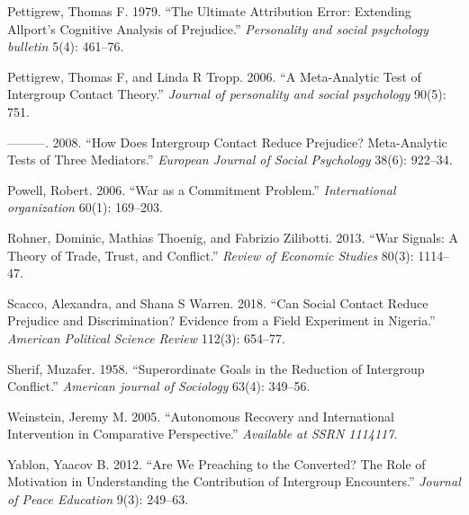 \documentclass[11pt]{article}
\begin{document}
\hypertarget{ref-pettigrew1979ultimate}{}
Pettigrew, Thomas F. 1979. ``The Ultimate Attribution Error: Extending
Allport's Cognitive Analysis of Prejudice.'' \emph{Personality and
social psychology bulletin} 5(4): 461--76.

\hypertarget{ref-pettigrew2006meta}{}
Pettigrew, Thomas F, and Linda R Tropp. 2006. ``A Meta-Analytic Test of
Intergroup Contact Theory.'' \emph{Journal of personality and social
psychology} 90(5): 751.

\hypertarget{ref-pettigrew2008does}{}
---------. 2008. ``How Does Intergroup Contact Reduce Prejudice?
Meta-Analytic Tests of Three Mediators.'' \emph{European Journal of
Social Psychology} 38(6): 922--34.

\hypertarget{ref-powell2006war}{}
Powell, Robert. 2006. ``War as a Commitment Problem.''
\emph{International organization} 60(1): 169--203.

\hypertarget{ref-rohner2013war}{}
Rohner, Dominic, Mathias Thoenig, and Fabrizio Zilibotti. 2013. ``War
Signals: A Theory of Trade, Trust, and Conflict.'' \emph{Review of
Economic Studies} 80(3): 1114--47.

\hypertarget{ref-scacco2018nigeria}{}
Scacco, Alexandra, and Shana S Warren. 2018. ``Can Social Contact Reduce
Prejudice and Discrimination? Evidence from a Field Experiment in
Nigeria.'' \emph{American Political Science Review} 112(3): 654--77.

\hypertarget{ref-sherif1958superordinate}{}
Sherif, Muzafer. 1958. ``Superordinate Goals in the Reduction of
Intergroup Conflict.'' \emph{American journal of Sociology} 63(4):
349--56.

\hypertarget{ref-weinstein2005autonomous}{}
Weinstein, Jeremy M. 2005. ``Autonomous Recovery and International
Intervention in Comparative Perspective.'' \emph{Available at SSRN
1114117}.

\hypertarget{ref-yablon2012we}{}
Yablon, Yaacov B. 2012. ``Are We Preaching to the Converted? The Role of
Motivation in Understanding the Contribution of Intergroup Encounters.''
\emph{Journal of Peace Education} 9(3): 249--63.
\end{document}

